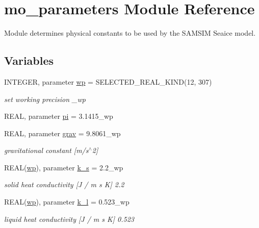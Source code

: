 \hypertarget{namespacemo__parameters}{
\section{mo\_\-parameters Module Reference}
\label{namespacemo__parameters}
}


Module determines physical constants to be used by the SAMSIM Seaice model.  


\subsection*{Variables}
\begin{DoxyCompactItemize}
\item 
INTEGER, parameter \hyperlink{namespacemo__parameters_a41be20bed1dcec244405328deaaffe30}{wp} = SELECTED\_\-REAL\_\-KIND(12, 307)
\begin{DoxyCompactList}\small\item\em set working precision \_\-wp \item\end{DoxyCompactList}\item 
REAL, parameter \hyperlink{namespacemo__parameters_ae2c1c26c67cd8e13b7693bbe2c5b717a}{pi} = 3.1415\_\-wp
\item 
REAL, parameter \hyperlink{namespacemo__parameters_adb294212d96151a282d82819bb97de4b}{grav} = 9.8061\_\-wp
\begin{DoxyCompactList}\small\item\em gravitational constant \mbox{[}m/s$^\wedge$2\mbox{]} \item\end{DoxyCompactList}\item 
REAL(\hyperlink{namespacemo__parameters_a41be20bed1dcec244405328deaaffe30}{wp}), parameter \hyperlink{namespacemo__parameters_ac0fbc3357bfcbb03857942aeefb16090}{k\_\-s} = 2.2\_\-wp
\begin{DoxyCompactList}\small\item\em solid heat conductivity \mbox{[}J / m s K\mbox{]} 2.2 \item\end{DoxyCompactList}\item 
REAL(\hyperlink{namespacemo__parameters_a41be20bed1dcec244405328deaaffe30}{wp}), parameter \hyperlink{namespacemo__parameters_aee1eca61b39f2038e51bfe41f1fbd574}{k\_\-l} = 0.523\_\-wp
\begin{DoxyCompactList}\small\item\em liquid heat conductivity \mbox{[}J / m s K\mbox{]} 0.523 \item\end{DoxyCompactList}\item 

\end{DoxyCompactItemize}
